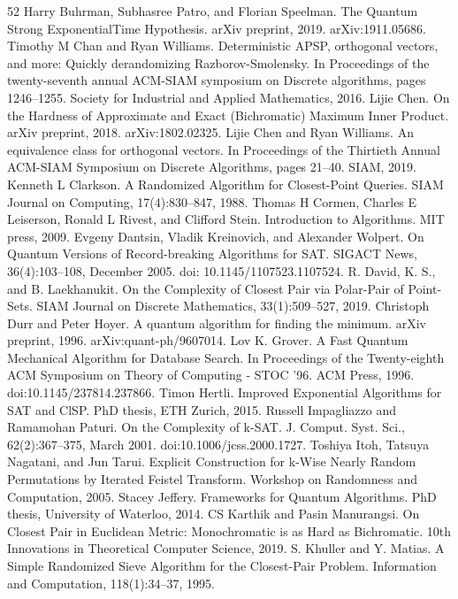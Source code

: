 \documentclass[10pt,a4paper]{article}
\begin{document}
\begin{thebibliography}{52}
 Harry Buhrman, Subhasree Patro, and Florian Speelman. The Quantum Strong ExponentialTime Hypothesis. arXiv preprint, 2019. arXiv:1911.05686.
 Timothy M Chan and Ryan Williams. Deterministic APSP, orthogonal vectors, and more: Quickly derandomizing Razborov-Smolensky. In Proceedings of the twenty-seventh annual ACM-SIAM symposium on Discrete algorithms, pages 1246–1255. Society for Industrial and Applied Mathematics, 2016.
 Lijie Chen. On the Hardness of Approximate and Exact (Bichromatic) Maximum Inner Product. arXiv preprint, 2018. arXiv:1802.02325.
 Lijie Chen and Ryan Williams. An equivalence class for orthogonal vectors. In Proceedings of the Thirtieth Annual ACM-SIAM Symposium on Discrete Algorithms, pages 21–40. SIAM, 2019.
 Kenneth L Clarkson. A Randomized Algorithm for Closest-Point Queries. SIAM Journal on Computing, 17(4):830–847, 1988.
 Thomas H Cormen, Charles E Leiserson, Ronald L Rivest, and Clifford Stein. Introduction to Algorithms. MIT press, 2009.
 Evgeny Dantsin, Vladik Kreinovich, and Alexander Wolpert. On Quantum Versions of Record-breaking Algorithms for SAT. SIGACT News, 36(4):103–108, December 2005. doi: 10.1145/1107523.1107524.
 R. David, K. S., and B. Laekhanukit. On the Complexity of Closest Pair via Polar-Pair of Point-Sets. SIAM Journal on Discrete Mathematics, 33(1):509–527, 2019.
 Christoph Durr and Peter Hoyer. A quantum algorithm for finding the minimum. arXiv preprint, 1996. arXiv:quant-ph/9607014.
 Lov K. Grover. A Fast Quantum Mechanical Algorithm for Database Search. In Proceedings of the Twenty-eighth ACM Symposium on Theory of Computing - STOC '96. ACM Press, 1996. doi:10.1145/237814.237866.
 Timon Hertli. Improved Exponential Algorithms for SAT and ClSP. PhD thesis, ETH Zurich, 2015.
 Russell Impagliazzo and Ramamohan Paturi. On the Complexity of k-SAT. J. Comput. Syst. Sci., 62(2):367–375, March 2001. doi:10.1006/jcss.2000.1727.
 Toshiya Itoh, Tatsuya Nagatani, and Jun Tarui. Explicit Construction for k-Wise Nearly Random Permutations by Iterated Feistel Transform. Workshop on Randomness and Computation, 2005.
 Stacey Jeffery. Frameworks for Quantum Algorithms. PhD thesis, University of Waterloo, 2014.
 CS Karthik and Pasin Manurangsi. On Closest Pair in Euclidean Metric: Monochromatic is as Hard as Bichromatic. 10th Innovations in Theoretical Computer Science, 2019.
 S. Khuller and Y. Matias. A Simple Randomized Sieve Algorithm for the Closest-Pair Problem. Information and Computation, 118(1):34–37, 1995.

\end{thebibliography}
\end{document}
